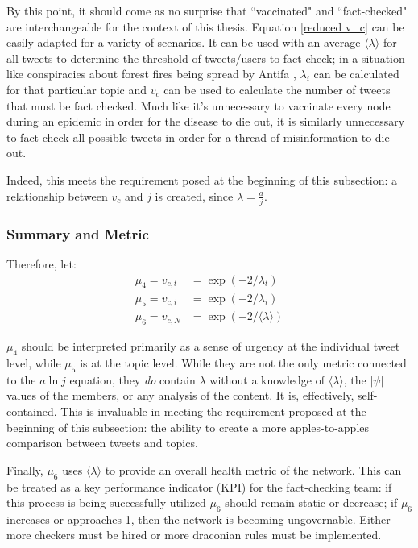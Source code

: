 \documentclass[preprint,review,12pt]{elsarticle}
\begin{document}
By this point, it should come as no surprise that ``vaccinated" and ``fact-checked" are interchangeable for the context of this thesis. Equation \ref{reduced v_c} can be easily adapted for a variety of scenarios. It can be used with an average $\langle \lambda \rangle$ for all tweets to determine the threshold of tweets/users to fact-check; in a situation like conspiracies about forest fires being spread by Antifa \citep{robinson2020oregon}, $\lambda_i$ can be calculated for that particular topic and $v_c$ can be used to calculate the number of tweets that must be fact checked. Much like it's unnecessary to vaccinate every node during an epidemic in order for the disease to die out, it is similarly unnecessary to fact check all possible tweets in order for a thread of misinformation to die out. 

Indeed, this meets the requirement posed at the beginning of this subsection: a relationship between $v_c$ and $j$ is created, since $\lambda = \frac{a}{j}$.

\subsubsection{Summary and Metric}

Therefore, let:
\begin{equation}
\label{mu_4 and mu_5}
\begin{split}
    \mu_4 = v_{c,t} & = \exp(-2/\lambda_{t}) \\
    \mu_5 = v_{c,i} & = \exp(-2/\lambda_{i}) \\
    \mu_6 = v_{c,N} & = \exp(-2/\langle \lambda \rangle)
\end{split}
\end{equation}

$\mu_4$ should be interpreted primarily as a sense of urgency at the individual tweet level, while $\mu_5$ is at the topic level. While they are not the only metric connected to the $a \ln j$ equation, they \textit{do} contain $\lambda$ without a knowledge of $\langle \lambda \rangle$, the $|\psi|$ values of the members, or any analysis of the content. It is, effectively, self-contained. This is invaluable in meeting the requirement proposed at the beginning of this subsection: the ability to create a more apples-to-apples comparison between tweets and topics. 

Finally, $\mu_6$ uses $\langle \lambda \rangle$ to provide an overall health metric of the network. This can be treated as a key performance indicator (KPI) for the fact-checking team: if this process is being successfully utilized $\mu_6$ should remain static or decrease; if $\mu_6$ increases or approaches 1, then the network is becoming ungovernable. Either more checkers must be hired or more draconian rules must be implemented.
\end{document}
